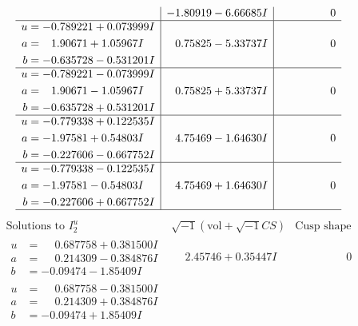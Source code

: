 \documentclass[1p]{elsarticle_modified}
\theoremstyle{definition}
\newcommand{\I}{\sqrt{-1}}
\begin{document}
$$\begin{array}{c|c|c}
 & -1.80919 - 6.66685 I & \phantom{-0.000000 } 0 \\ \hline\begin{aligned}
u &= -0.789221 + 0.073999 I \\
a &= \phantom{-}1.90671 + 1.05967 I \\
b &= -0.635728 - 0.531201 I\end{aligned}
 & \phantom{-}0.75825 - 5.33737 I & \phantom{-0.000000 } 0 \\ \hline\begin{aligned}
u &= -0.789221 - 0.073999 I \\
a &= \phantom{-}1.90671 - 1.05967 I \\
b &= -0.635728 + 0.531201 I\end{aligned}
 & \phantom{-}0.75825 + 5.33737 I & \phantom{-0.000000 } 0 \\ \hline\begin{aligned}
u &= -0.779338 + 0.122535 I \\
a &= -1.97581 + 0.54803 I \\
b &= -0.227606 - 0.667752 I\end{aligned}
 & \phantom{-}4.75469 - 1.64630 I & \phantom{-0.000000 } 0 \\ \hline\begin{aligned}
u &= -0.779338 - 0.122535 I \\
a &= -1.97581 - 0.54803 I \\
b &= -0.227606 + 0.667752 I\end{aligned}
 & \phantom{-}4.75469 + 1.64630 I & \phantom{-0.000000 } 0\\
 \hline 
 \end{array}$$\newpage$$\begin{array}{c|c|c}  
\text{Solutions to }I^u_{2}& \I (\text{vol} + \sqrt{-1}CS) & \text{Cusp shape}\\
 \hline 
\begin{aligned}
u &= \phantom{-}0.687758 + 0.381500 I \\
a &= \phantom{-}0.214309 - 0.384876 I \\
b &= -0.09474 - 1.85409 I\end{aligned}
 & \phantom{-}2.45746 + 0.35447 I & \phantom{-0.000000 } 0 \\ \hline\begin{aligned}
u &= \phantom{-}0.687758 - 0.381500 I \\
a &= \phantom{-}0.214309 + 0.384876 I \\
b &= -0.09474 + 1.85409 I\end{aligned}

\end{array}$$
\end{document}
